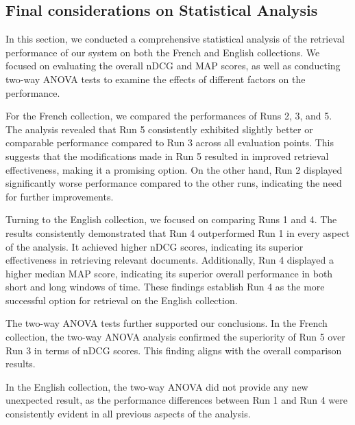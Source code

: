 \newpage
\enlargethispage{4\baselineskip}
\subsection{Final considerations on Statistical Analysis}

In this section, we conducted a comprehensive statistical analysis of the retrieval performance of our system on both the French and English collections. 
We focused on evaluating the overall \ac{nDCG} and \ac{MAP} scores, as well as conducting two-way \ac{ANOVA} tests to examine the effects of different factors on the performance.

For the French collection, we compared the performances of Runs 2, 3, and 5. 
The analysis revealed that Run 5 consistently exhibited slightly better or comparable performance compared to Run 3 across all evaluation points. 
This suggests that the modifications made in Run 5 resulted in improved retrieval effectiveness, making it a promising option. 
On the other hand, Run 2 displayed significantly worse performance compared to the other runs, indicating the need for further improvements.

Turning to the English collection, we focused on comparing Runs 1 and 4. 
The results consistently demonstrated that Run 4 outperformed Run 1 in every aspect of the analysis. 
It achieved higher \ac{nDCG} scores, indicating its superior effectiveness in retrieving relevant documents. 
Additionally, Run 4 displayed a higher median \ac{MAP} score, indicating its superior overall performance in both short and long windows of time. 
These findings establish Run 4 as the more successful option for retrieval on the English collection.

The two-way \ac{ANOVA} tests further supported our conclusions. 
In the French collection, the two-way \ac{ANOVA} analysis confirmed the superiority of Run 5 over Run 3 in terms of \ac{nDCG} scores. 
This finding aligns with the overall comparison results. 

In the English collection, the two-way \ac{ANOVA} did not provide any new unexpected result, as the performance differences between Run 1 and Run 4 were consistently evident in all previous aspects of the analysis.

